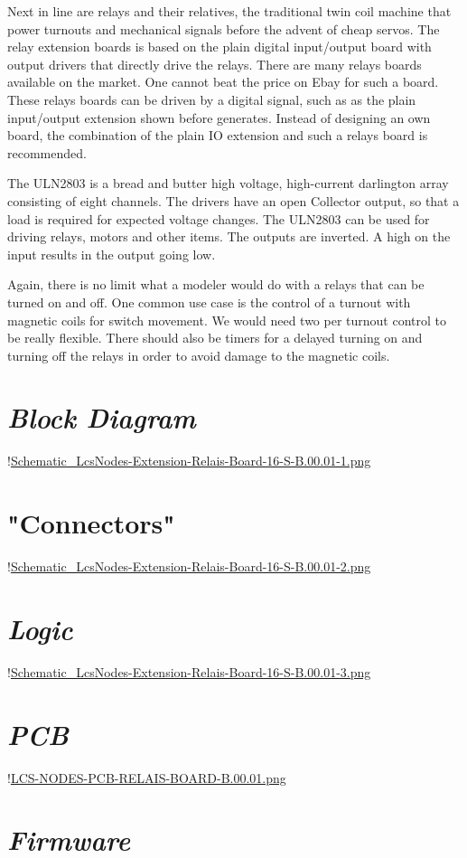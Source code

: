 
Next in line are relays and their relatives, the traditional twin coil machine that power turnouts and mechanical signals before the advent of cheap servos. The relay extension boards is based on the plain digital input/output board with output drivers that directly drive the relays. There are many relays boards available on the market. One cannot beat the price on Ebay for such a board. These relays boards can be driven by a digital signal, such as as the plain input/output extension shown before generates. Instead of designing an own board, the combination of the plain IO extension and such a relays board is recommended.

The ULN2803 is a bread and butter high voltage, high-current darlington array consisting of eight channels. The drivers have an open Collector output, so that a load is required for expected voltage changes. The ULN2803 can be used for driving relays, motors and other items. The outputs are inverted. A high on the input results in the output going low.


Again, there is no limit what a modeler would do with a relays that can be turned on and off. One common use case is the control of a turnout with magnetic coils for switch movement. We would need two per turnout control to be really flexible. There should also be timers for a delayed turning on and turning off the relays in order to avoid damage to the magnetic coils.

\section{\textit{Block Diagram}}

!\href{./Schematics/Schematic_LcsNodes-Extension-Relais-Board-16-S-B.00.01-1.png "}{Schematic_LcsNodes-Extension-Relais-Board-16-S-B.00.01-1.png}

\section{"Connectors"}

!\href{./Schematics/Schematic_LcsNodes-Extension-Relais-Board-16-S-B.00.01-2.png "}{Schematic_LcsNodes-Extension-Relais-Board-16-S-B.00.01-2.png}

\section{\textit{Logic}}

!\href{./Schematics/Schematic_LcsNodes-Extension-Relais-Board-16-S-B.00.01-3.png }{Schematic_LcsNodes-Extension-Relais-Board-16-S-B.00.01-3.png}

\section{\textit{PCB}}

!\href{./Boards/LCS-NODES-PCB-RELAIS-BOARD-B.00.01.png }{LCS-NODES-PCB-RELAIS-BOARD-B.00.01.png}

\section{\textit{Firmware}}